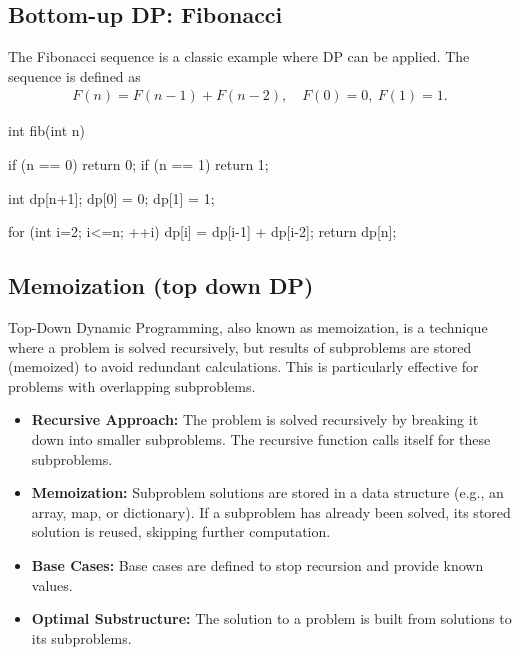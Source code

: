\documentclass{report}
\begin{document}
\subsection{Bottom-up DP: Fibonacci}
\bigbreak \noindent 
The Fibonacci sequence is a classic example where DP can be applied. The sequence is defined as
\begin{align*}
    F(n) = F(n-1) + F(n-2), \quad F(0) = 0,\ F(1) = 1
.\end{align*}
\bigbreak \noindent 
\begin{cppcode}
    int fib(int n) {
        if (n == 0) return 0;
        if (n == 1) return 1;

        int dp[n+1];
        dp[0] = 0;
        dp[1] = 1;

        for (int i=2; i<=n; ++i) {
            dp[i] = dp[i-1] + dp[i-2];
        }
        return dp[n];
    }
\end{cppcode}

\bigbreak \noindent 
\subsection{Memoization (top down DP)}
\bigbreak \noindent 
Top-Down Dynamic Programming, also known as memoization, is a technique where a problem is solved recursively, but results of subproblems are stored (memoized) to avoid redundant calculations. This is particularly effective for problems with overlapping subproblems.
\bigbreak \noindent 
\begin{itemize}
    \item \textbf{Recursive Approach:} The problem is solved recursively by breaking it down into smaller subproblems.
        \bigbreak \noindent 
        The recursive function calls itself for these subproblems.
    \item \textbf{Memoization:} Subproblem solutions are stored in a data structure (e.g., an array, map, or dictionary).
        \bigbreak \noindent 
        If a subproblem has already been solved, its stored solution is reused, skipping further computation.
    \item \textbf{Base Cases:} Base cases are defined to stop recursion and provide known values.
    \item \textbf{Optimal Substructure:} The solution to a problem is built from solutions to its subproblems.
\end{itemize}

\bigbreak \noindent 
\end{document}
